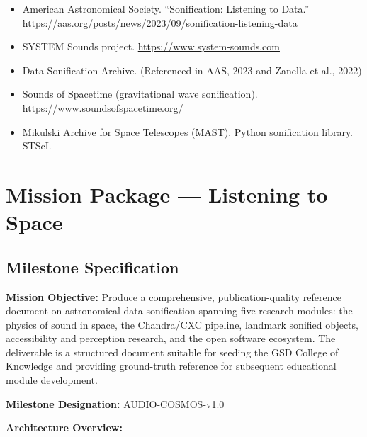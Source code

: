\documentclass[11pt,letterpaper]{article}
\newcommand{\stageheader}[2]{%
  \noindent\colorbox{#2}{\makebox[\textwidth][l]{%
    \textcolor{white}{\bfseries\sffamily\hspace{6pt}#1\hspace{6pt}}}}%
  \vspace{0.5em}\par%
}
\begin{document}
\begin{itemize}
  \item American Astronomical Society. ``Sonification: Listening to Data.'' \url{https://aas.org/posts/news/2023/09/sonification-listening-data}
  \item SYSTEM Sounds project. \url{https://www.system-sounds.com}
  \item Data Sonification Archive. (Referenced in AAS, 2023 and Zanella et al., 2022)
  \item Sounds of Spacetime (gravitational wave sonification). \url{https://www.soundsofspacetime.org/}
  \item Mikulski Archive for Space Telescopes (MAST). Python sonification library. STScI.
\end{itemize}

\newpage
\stageheader{STAGE 3 --- MISSION PACKAGE}{tertiary}

\section{Mission Package — Listening to Space}

\subsection{Milestone Specification}

\textbf{Mission Objective:} Produce a comprehensive, publication-quality reference document on astronomical data sonification spanning five research modules: the physics of sound in space, the Chandra/CXC pipeline, landmark sonified objects, accessibility and perception research, and the open software ecosystem. The deliverable is a structured document suitable for seeding the GSD College of Knowledge and providing ground-truth reference for subsequent educational module development.

\textbf{Milestone Designation:} AUDIO-COSMOS-v1.0

\textbf{Architecture Overview:}
\end{document}
